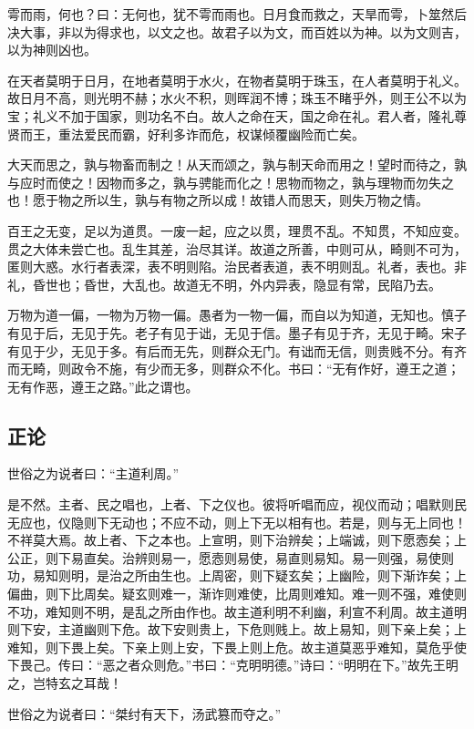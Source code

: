 \documentclass[]{article}
\begin{document}
雩而雨，何也？曰：无何也，犹不雩而雨也。日月食而救之，天旱而雩，卜筮然后决大事，非以为得求也，以文之也。故君子以为文，而百姓以为神。以为文则吉，以为神则凶也。

在天者莫明于日月，在地者莫明于水火，在物者莫明于珠玉，在人者莫明于礼义。故日月不高，则光明不赫；水火不积，则晖润不博；珠玉不睹乎外，则王公不以为宝；礼义不加于国家，则功名不白。故人之命在天，国之命在礼。君人者，隆礼尊贤而王，重法爱民而霸，好利多诈而危，权谋倾覆幽险而亡矣。

大天而思之，孰与物畜而制之！从天而颂之，孰与制天命而用之！望时而待之，孰与应时而使之！因物而多之，孰与骋能而化之！思物而物之，孰与理物而勿失之也！愿于物之所以生，孰与有物之所以成！故错人而思天，则失万物之情。

百王之无变，足以为道贯。一废一起，应之以贯，理贯不乱。不知贯，不知应变。贯之大体未尝亡也。乱生其差，治尽其详。故道之所善，中则可从，畸则不可为，匿则大惑。水行者表深，表不明则陷。治民者表道，表不明则乱。礼者，表也。非礼，昏世也；昏世，大乱也。故道无不明，外内异表，隐显有常，民陷乃去。

万物为道一偏，一物为万物一偏。愚者为一物一偏，而自以为知道，无知也。慎子有见于后，无见于先。老子有见于诎，无见于信。墨子有见于齐，无见于畸。宋子有见于少，无见于多。有后而无先，则群众无门。有诎而无信，则贵贱不分。有齐而无畸，则政令不施，有少而无多，则群众不化。书曰：``无有作好，遵王之道；无有作恶，遵王之路。''此之谓也。

\hypertarget{header-n80}{%
\subsection{正论}\label{header-n80}}

世俗之为说者曰：``主道利周。''

是不然。主者、民之唱也，上者、下之仪也。彼将听唱而应，视仪而动；唱默则民无应也，仪隐则下无动也；不应不动，则上下无以相有也。若是，则与无上同也！不祥莫大焉。故上者、下之本也。上宣明，则下治辨矣；上端诚，则下愿悫矣；上公正，则下易直矣。治辨则易一，愿悫则易使，易直则易知。易一则强，易使则功，易知则明，是治之所由生也。上周密，则下疑玄矣；上幽险，则下渐诈矣；上偏曲，则下比周矣。疑玄则难一，渐诈则难使，比周则难知。难一则不强，难使则不功，难知则不明，是乱之所由作也。故主道利明不利幽，利宣不利周。故主道明则下安，主道幽则下危。故下安则贵上，下危则贱上。故上易知，则下亲上矣；上难知，则下畏上矣。下亲上则上安，下畏上则上危。故主道莫恶乎难知，莫危乎使下畏己。传曰：``恶之者众则危。''书曰：``克明明德。''诗曰：``明明在下。''故先王明之，岂特玄之耳哉！

世俗之为说者曰：``桀纣有天下，汤武篡而夺之。''
\end{document}
